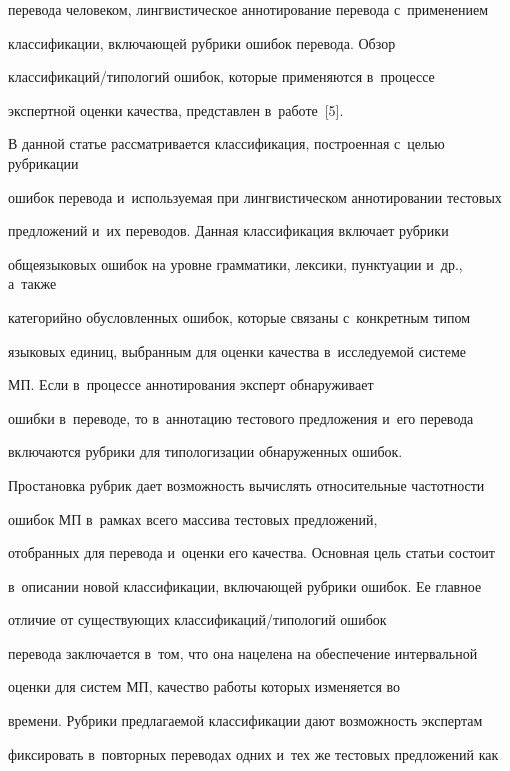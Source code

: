 перевода человеком, лингвистическое аннотирование перевода с~применением 


классификации, включающей рубрики ошибок перевода. Обзор  


клас\-си\-фи\-ка\-ций\!/\!ти\-по\-ло\-гий ошибок, которые применяются в~процессе 


экспертной оценки качества, представлен в~работе~[5].


  


  В данной статье рассматривается классификация, построенная с~целью руб\-ри\-ка\-ции 


ошибок перевода и~используемая при лингвистическом аннотировании тестовых 


предложений и~их переводов. Данная классификация включает рубрики 


общеязыковых ошибок на уровне грамматики, лексики, пунктуации и~др., а~также 


категорийно обусловленных ошибок, которые связаны с~конкретным типом 


языковых единиц, выбранным для оценки качества в~исследуемой системе 


МП. Если в~процессе аннотирования эксперт обнаруживает 


ошибки в~переводе, то в~аннотацию тестового предложения и~его перевода 


включаются рубрики для типологизации обнаруженных ошибок.


  


  Простановка рубрик дает возможность вычислять относительные час\-тот\-ности 


ошибок МП в~рамках всего массива тестовых предложений, 


отобранных для перевода и~оценки его качества. Основная цель статьи состоит 


в~описании новой классификации, вклю\-ча\-ющей руб\-ри\-ки ошибок. Ее главное 


отличие от существующих клас\-си\-фи\-ка\-ций\!/\!ти\-по\-ло\-гий ошибок 


перевода заключается в~том, что она нацелена на обеспечение интервальной 


оценки для сис\-тем МП, качество работы которых изменяется во 


времени. Руб\-ри\-ки пред\-ла\-га\-емой классификации дают воз\-мож\-ность экспертам 


фиксировать в~повторных переводах одних и~тех же тестовых предложений как 


